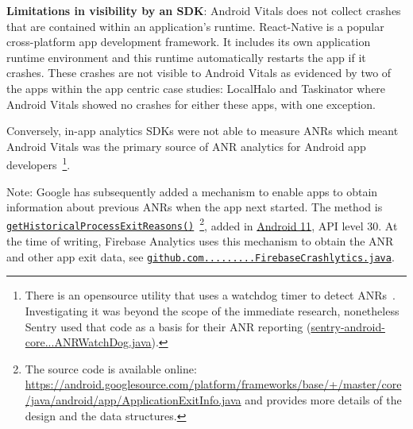 \textbf{Limitations in visibility by an SDK}:
Android Vitals does not collect crashes that are contained within an application's runtime. React-Native is a popular cross-platform app development framework. It includes its own application runtime environment and this runtime automatically restarts the app if it crashes. These crashes are not visible to Android Vitals as evidenced by two of the apps within the app centric case studies: LocalHalo and Taskinator where Android Vitals showed no crashes for either these apps, with one exception. 

Conversely, in-app analytics SDKs were not able to measure ANRs which meant Android Vitals was the primary source of ANR analytics for Android app developers~\footnote{There is an opensource utility that uses a watchdog timer to detect ANRs~\citep{salomonbrys_github_anr_watchdog}. Investigating it was beyond the scope of the immediate research, nonetheless Sentry used that code as a basis for their ANR reporting (\href{https://github.com/getsentry/sentry-java/blob/3f8d7b1cc869bb056c9db99b459e43f6c375784a/sentry-android-core/src/main/java/io/sentry/android/core/ANRWatchDog.java}{sentry-android-core...ANRWatchDog.java}).}. 

Note: Google has subsequently added a mechanism to enable apps to obtain information about previous ANRs when the app next started. The method is \href{https://developer.android.com/reference/kotlin/android/app/ActivityManager#gethistoricalprocessexitreasons}{\texttt{getHistoricalProcessExitReasons()}}~\footnote{The source code is available online: \url{https://android.googlesource.com/platform/frameworks/base/+/master/core/java/android/app/ApplicationExitInfo.java} and provides more details of the design and the data structures.}, added in \href{https://developer.android.com/about/versions/11}{Android 11}, API level 30.
%
At the time of writing, Firebase Analytics uses this mechanism to obtain the ANR and other app exit data, see \href{https://github.com/firebase/firebase-android-sdk/blob/73131b69b0134456441e7fa218964b6a766fcec7/firebase-crashlytics/src/main/java/com/google/firebase/crashlytics/FirebaseCrashlytics.java}{\texttt{github.com.........FirebaseCrashlytics.java}}.

